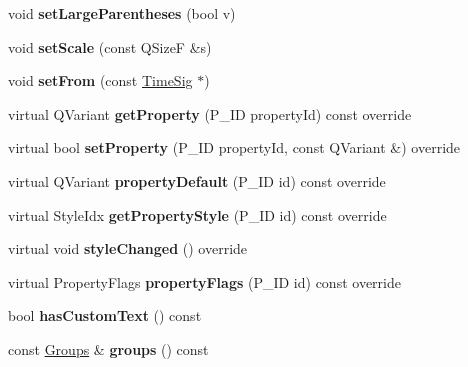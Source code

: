 \begin{DoxyCompactItemize}
void {\bfseries set\+Large\+Parentheses} (bool v)
\item 
\mbox{\label{class_ms_1_1_time_sig_a938bd9eabdd552d94c39611eba4bac3a}} 
void {\bfseries set\+Scale} (const Q\+SizeF \&s)
\item 
\mbox{\label{class_ms_1_1_time_sig_a0f9bd001da81940a64e2576dca966db2}} 
void {\bfseries set\+From} (const \hyperlink{class_ms_1_1_time_sig}{Time\+Sig} $\ast$)
\item 
\mbox{\label{class_ms_1_1_time_sig_a18e127cd71338e50ed05f852dd65f56d}} 
virtual Q\+Variant {\bfseries get\+Property} (P\+\_\+\+ID property\+Id) const override
\item 
\mbox{\label{class_ms_1_1_time_sig_a1851a7d881bc756463ed7f858c2c5f41}} 
virtual bool {\bfseries set\+Property} (P\+\_\+\+ID property\+Id, const Q\+Variant \&) override
\item 
\mbox{\label{class_ms_1_1_time_sig_a40098cef3787016c21356dba556ac4ba}} 
virtual Q\+Variant {\bfseries property\+Default} (P\+\_\+\+ID id) const override
\item 
\mbox{\label{class_ms_1_1_time_sig_a8dc8dc3b0af80ed759076d2456f98c4c}} 
virtual Style\+Idx {\bfseries get\+Property\+Style} (P\+\_\+\+ID id) const override
\item 
\mbox{\label{class_ms_1_1_time_sig_acb05ff9f4e00ed876e882306af9a2b18}} 
virtual void {\bfseries style\+Changed} () override
\item 
\mbox{\label{class_ms_1_1_time_sig_ab6ff77e2af9be020dab83f8a24ef656b}} 
virtual Property\+Flags {\bfseries property\+Flags} (P\+\_\+\+ID id) const override
\item 
\mbox{\label{class_ms_1_1_time_sig_a1c0d3fb3058594dcb05670714538899b}} 
bool {\bfseries has\+Custom\+Text} () const
\item 
\mbox{\label{class_ms_1_1_time_sig_a94c56d3ec77db1720fddfb2d51cb16ec}} 
const \hyperlink{class_ms_1_1_groups}{Groups} \& {\bfseries groups} () const

\end{DoxyCompactItemize}
